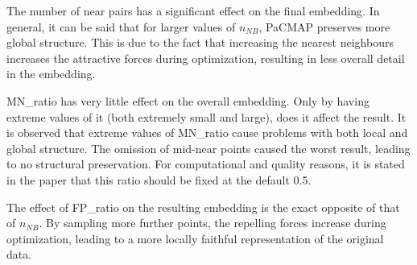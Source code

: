 The number of near pairs has a significant effect on the final embedding. In general, it can be said that for larger values of $n_{NB}$, PaCMAP preserves more global structure. This is due to the fact that increasing the nearest neighbours increases the attractive forces during optimization, resulting in less overall detail in the embedding.

MN\_ratio has very little effect on the overall embedding. Only by having extreme values of it (both extremely small and large), does it affect the result. It is observed that extreme values of MN\_ratio cause problems with both local and global structure. The omission of mid-near points caused the worst result, leading to no structural preservation. For computational and quality reasons, it is stated in the paper that this ratio should be fixed at the default 0.5.

The effect of FP\_ratio on the resulting embedding is the exact opposite of that of $n_{NB}$. By sampling more further points, the repelling forces increase during optimization, leading to a more locally faithful representation of the original data.

